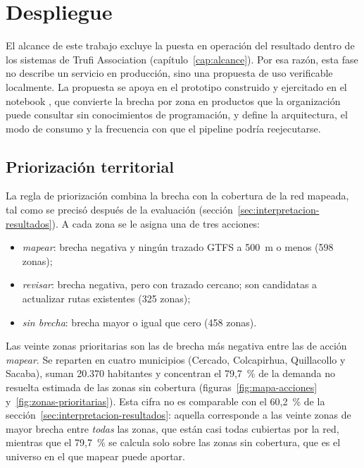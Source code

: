 \section{Despliegue}
\label{sec:despliegue}

El alcance de este trabajo excluye la puesta en operación del resultado dentro de los
sistemas de Trufi Association (capítulo~\ref{cap:alcance}). Por esa razón, esta fase no
describe un servicio en producción, sino una propuesta de uso verificable localmente. La
propuesta se apoya en el prototipo construido y ejercitado en el notebook
, que convierte la brecha por zona en productos que la organización puede
consultar sin conocimientos de programación, y define la arquitectura, el modo de consumo y
la frecuencia con que el pipeline podría reejecutarse.

\subsection{Priorización territorial}
\label{sec:priorizacion}

La regla de priorización combina la brecha con la cobertura de la red mapeada, tal como se
precisó después de la evaluación (sección~\ref{sec:interpretacion-resultados}). A cada zona
se le asigna una de tres acciones:
\begin{itemize}
  \item \emph{mapear}: brecha negativa y ningún trazado GTFS a 500~m o menos (598 zonas);
  \item \emph{revisar}: brecha negativa, pero con trazado cercano; son candidatas a
        actualizar rutas existentes (325 zonas);
  \item \emph{sin brecha}: brecha mayor o igual que cero (458 zonas).
\end{itemize}
Las veinte zonas prioritarias son las de brecha más negativa entre las de acción
\emph{mapear}. Se reparten en cuatro municipios (Cercado, Colcapirhua, Quillacollo y
Sacaba), suman 20.370 habitantes y concentran el 79,7~\% de la demanda no resuelta estimada
de las zonas sin cobertura (figuras~\ref{fig:mapa-acciones} y~\ref{fig:zonas-prioritarias}).
Esta cifra no es comparable con el 60,2~\% de la sección~\ref{sec:interpretacion-resultados}:
aquella corresponde a las veinte zonas de mayor brecha entre \emph{todas} las zonas, que
están casi todas cubiertas por la red, mientras que el 79,7~\% se calcula solo sobre las
zonas sin cobertura, que es el universo en el que mapear puede aportar.

